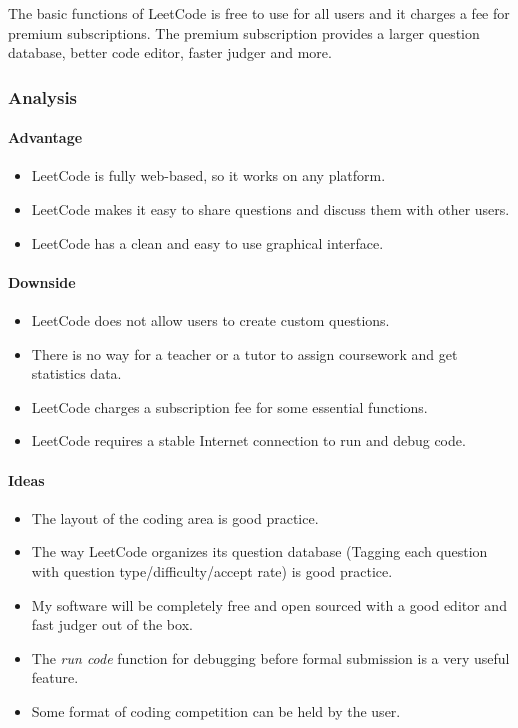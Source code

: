 \documentclass{report}
\begin{document}
The basic functions of LeetCode is free to use for all users and it charges a fee for premium subscriptions. The premium subscription provides a larger question database, better code editor, faster judger and more.

\subsubsection{Analysis}

\paragraph{Advantage}

\begin{itemize}
    \item LeetCode is fully web-based, so it works on any platform.
    \item LeetCode makes it easy to share questions and discuss them with other users.
    \item LeetCode has a clean and easy to use graphical interface.
\end{itemize}

\paragraph{Downside}

\begin{itemize}
    \item LeetCode does not allow users to create custom questions.
    \item There is no way for a teacher or a tutor to assign coursework and get statistics data.
    \item LeetCode charges a subscription fee for some essential functions.
    \item LeetCode requires a stable Internet connection to run and debug code.
\end{itemize}

\paragraph{Ideas}

\begin{itemize}
    \item The layout of the coding area is good practice.
    \item The way LeetCode organizes its question database (Tagging each question with question type/difficulty/accept rate) is good practice.
    \item My software will be completely free and open sourced with a good editor and fast judger out of the box.
    \item The \emph{run code} function for debugging before formal submission is a very useful feature.
    \item Some format of coding competition can be held by the user.
\end{itemize}
\end{document}

